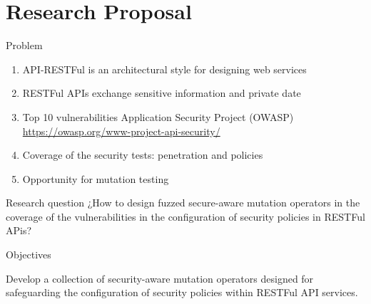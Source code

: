 \documentclass[10pt]{beamer}
\theoremstyle{remark}
\theoremstyle{definition}
\begin{document}
\section{Research Proposal}

\begin{frame}{Problem}

\begin{enumerate}
    \item API-RESTFul is an architectural style for designing web services
    \item RESTFul APIs exchange sensitive information and private date
    \item Top 10 vulnerabilities Application Security Project (OWASP) \url{https://owasp.org/www-project-api-security/}
    \item Coverage of the security tests: penetration and policies
    \item Opportunity for mutation testing
\end{enumerate}
\end{frame}


\begin{frame}{Research question}
¿How to design fuzzed secure-aware mutation operators in the coverage of the vulnerabilities in the configuration of security policies in RESTFul APis?
\end{frame}



\begin{frame}{Objectives}

Develop a collection of security-aware mutation operators designed for safeguarding the configuration of security policies within RESTFul API services.

\end{frame}
\end{document}
